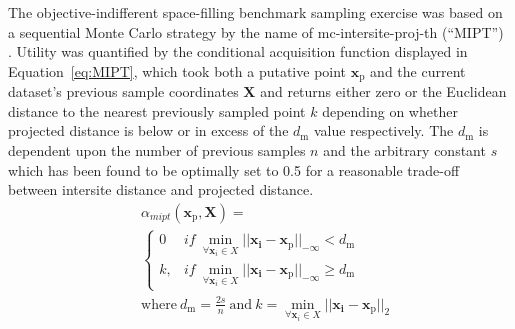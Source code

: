 The objective-indifferent space-filling benchmark sampling exercise was based
 on a sequential Monte Carlo strategy by the name of mc-intersite-proj-th
 (``MIPT'') \autocite{Crombecq2011}.
Utility was quantified by the conditional acquisition function displayed
 in Equation~\ref{eq:MIPT}, which took both a putative point
 \(\mathbf{x}_{\mathrm{p}}\) and the current dataset's previous sample coordinates
 \(\mathbf{X}\) and returns either zero or the Euclidean distance to the
 nearest previously sampled point \(k\) depending on whether projected
 distance is below or in excess of the \(d_{\mathrm{m}}\) value respectively.
The \(d_{\mathrm{m}}\) is dependent upon the number of previous samples \(n\) and the
 arbitrary constant \(s\) which has been found to be optimally set to 0.5
 for a reasonable trade-off between intersite distance and projected
 distance.
\footnotesize
\begin{equation}\label{eq:MIPT}
    \begin{split}
        &\alpha_{mipt}(\mathbf{x}_{\mathrm{p}},\mathbf{X}) =\\
        &\begin{cases}
            0       & if\:\min\limits_{\forall \mathbf{x}_i \in X}||\mathbf{x_{i}-\mathbf{x_{\mathrm{p}}}}||_{-\infty}<d_{\mathrm{m}}\\
            k,      & if\:\min\limits_{\forall \mathbf{x}_i \in X}||\mathbf{x_{i}-\mathbf{x_{\mathrm{p}}}}||_{-\infty}\ge d_{\mathrm{m}}
         \end{cases}\\
        &\mathrm{where}\:d_{\mathrm{m}}=\frac{2s}{n}\:\mathrm{and}\:k=\min\limits_{\forall \mathbf{x}_i \in X}||\mathbf{x_{i}-\mathbf{x_{\mathrm{p}}}}||_{2}
    \end{split}
\end{equation}
\normalsize

